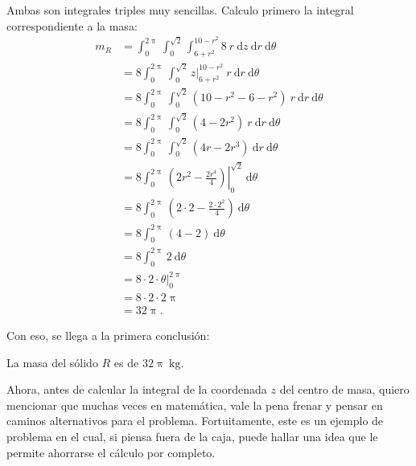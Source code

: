 \documentclass{fmbvecto}
\begin{document}
\begin{problema}
Ambas son integrales triples muy sencillas. Calculo primero la integral correspondiente a la masa:
\begin{align*}
    m_R &= \int_{0}^{2\uppi} \int_{0}^{\sqrt{2}} \int_{6 + r^2}^{10 - r^2} 8 \: r \: \mathrm{d}z \: \mathrm{d}r \: \mathrm{d}\theta \\
    &= 8 \int_{0}^{2\uppi} \int_{0}^{\sqrt{2}} \left. z \right\vert_{6 + r^2}^{10 - r^2} \: r \: \mathrm{d}r \: \mathrm{d}\theta \\
    &= 8 \int_{0}^{2\uppi} \int_{0}^{\sqrt{2}} (10 - r^2 - 6 - r^2) \: r \: \mathrm{d}r \: \mathrm{d}\theta \\
    &= 8 \int_{0}^{2\uppi} \int_{0}^{\sqrt{2}} (4 - 2r^2) \: r \: \mathrm{d}r \: \mathrm{d}\theta \\
    &= 8 \int_{0}^{2\uppi} \int_{0}^{\sqrt{2}} (4r - 2r^3) \: \mathrm{d}r \: \mathrm{d}\theta \\
    &= 8 \int_{0}^{2\uppi} \left. \left(2r^2 - \frac{2r^4}{4}\right) \right\vert_{0}^{\sqrt{2}} \: \mathrm{d}\theta \\
    &= 8 \int_{0}^{2\uppi} \left(2 \cdot 2 - \frac{2 \cdot 2^2}{4}\right) \: \mathrm{d}\theta \\
    &= 8 \int_{0}^{2\uppi} (4 - 2) \: \mathrm{d}\theta \\
    &= 8 \int_{0}^{2\uppi} 2 \: \mathrm{d}\theta \\
    &= 8 \cdot 2 \cdot \left.\theta \right\vert_{0}^{2\uppi} \\
    &= 8 \cdot 2 \cdot 2\uppi \\
    &= 32\uppi.
\end{align*}

Con eso, se llega a la primera conclusión:
\begin{gbox}
    La masa del sólido \(R\) es de \(32\uppi \: \text{kg}\).
\end{gbox}
\vspace*{1em}
Ahora, antes de calcular la integral de la coordenada \(z\) del centro de masa, quiero mencionar que muchas veces en matemática, vale la pena frenar y pensar en caminos alternativos para el problema. Fortuitamente, este es un ejemplo de problema en el cual, si piensa fuera de la caja, puede hallar una idea que le permite ahorrarse el cálculo por completo.


\end{problema}
\end{document}
